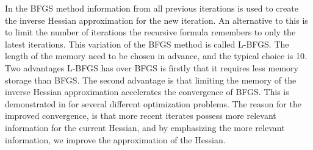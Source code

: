 In the BFGS method information from all previous iterations is used to create the inverse Hessian approximation for the new iteration. An alternative to this is to limit the number of iterations the recursive formula remembers to only the latest iterations. This variation of the BFGS method is called L-BFGS\cite{nocedal1980updating}. The length of the memory need to be chosen in advance, and the typical choice is 10. Two advantages L-BFGS has over BFGS is firstly that it requires less memory storage than BFGS. The second advantage is that limiting the memory of the inverse Hessian approximation accelerates the convergence of BFGS. This is demonstrated in \cite{liu1989limited} for several different optimization problems. The reason for the improved convergence, is that more recent iterates possess more relevant information for the current Hessian, and by emphasizing the more relevant information, we improve the approximation of the Hessian.

